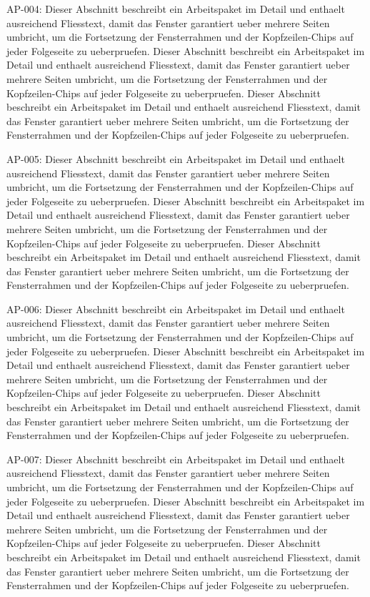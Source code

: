 \documentclass[type=report,theme=dark,language=de]{semio}
\begin{document}
\begin{Table}[title=Lange Tabelle]
AP-004: Dieser Abschnitt beschreibt ein Arbeitspaket im Detail und enthaelt ausreichend Fliesstext, damit das Fenster garantiert ueber mehrere Seiten umbricht, um die Fortsetzung der Fensterrahmen und der Kopfzeilen-Chips auf jeder Folgeseite zu ueberpruefen. Dieser Abschnitt beschreibt ein Arbeitspaket im Detail und enthaelt ausreichend Fliesstext, damit das Fenster garantiert ueber mehrere Seiten umbricht, um die Fortsetzung der Fensterrahmen und der Kopfzeilen-Chips auf jeder Folgeseite zu ueberpruefen. Dieser Abschnitt beschreibt ein Arbeitspaket im Detail und enthaelt ausreichend Fliesstext, damit das Fenster garantiert ueber mehrere Seiten umbricht, um die Fortsetzung der Fensterrahmen und der Kopfzeilen-Chips auf jeder Folgeseite zu ueberpruefen. 

AP-005: Dieser Abschnitt beschreibt ein Arbeitspaket im Detail und enthaelt ausreichend Fliesstext, damit das Fenster garantiert ueber mehrere Seiten umbricht, um die Fortsetzung der Fensterrahmen und der Kopfzeilen-Chips auf jeder Folgeseite zu ueberpruefen. Dieser Abschnitt beschreibt ein Arbeitspaket im Detail und enthaelt ausreichend Fliesstext, damit das Fenster garantiert ueber mehrere Seiten umbricht, um die Fortsetzung der Fensterrahmen und der Kopfzeilen-Chips auf jeder Folgeseite zu ueberpruefen. Dieser Abschnitt beschreibt ein Arbeitspaket im Detail und enthaelt ausreichend Fliesstext, damit das Fenster garantiert ueber mehrere Seiten umbricht, um die Fortsetzung der Fensterrahmen und der Kopfzeilen-Chips auf jeder Folgeseite zu ueberpruefen. 

AP-006: Dieser Abschnitt beschreibt ein Arbeitspaket im Detail und enthaelt ausreichend Fliesstext, damit das Fenster garantiert ueber mehrere Seiten umbricht, um die Fortsetzung der Fensterrahmen und der Kopfzeilen-Chips auf jeder Folgeseite zu ueberpruefen. Dieser Abschnitt beschreibt ein Arbeitspaket im Detail und enthaelt ausreichend Fliesstext, damit das Fenster garantiert ueber mehrere Seiten umbricht, um die Fortsetzung der Fensterrahmen und der Kopfzeilen-Chips auf jeder Folgeseite zu ueberpruefen. Dieser Abschnitt beschreibt ein Arbeitspaket im Detail und enthaelt ausreichend Fliesstext, damit das Fenster garantiert ueber mehrere Seiten umbricht, um die Fortsetzung der Fensterrahmen und der Kopfzeilen-Chips auf jeder Folgeseite zu ueberpruefen. 

AP-007: Dieser Abschnitt beschreibt ein Arbeitspaket im Detail und enthaelt ausreichend Fliesstext, damit das Fenster garantiert ueber mehrere Seiten umbricht, um die Fortsetzung der Fensterrahmen und der Kopfzeilen-Chips auf jeder Folgeseite zu ueberpruefen. Dieser Abschnitt beschreibt ein Arbeitspaket im Detail und enthaelt ausreichend Fliesstext, damit das Fenster garantiert ueber mehrere Seiten umbricht, um die Fortsetzung der Fensterrahmen und der Kopfzeilen-Chips auf jeder Folgeseite zu ueberpruefen. Dieser Abschnitt beschreibt ein Arbeitspaket im Detail und enthaelt ausreichend Fliesstext, damit das Fenster garantiert ueber mehrere Seiten umbricht, um die Fortsetzung der Fensterrahmen und der Kopfzeilen-Chips auf jeder Folgeseite zu ueberpruefen. 


\end{Table}
\end{document}

